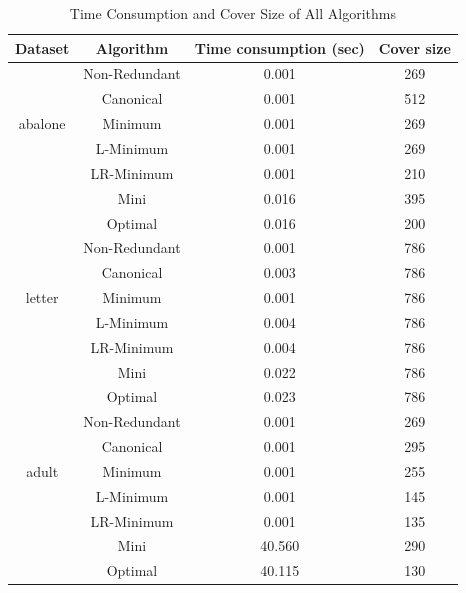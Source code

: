 \documentclass[11pt]{book}
\begin{document}
\begin{table}[H]

	\centering
	
\begin{tabular}{|c|c|c|c|}

    \hline
    Dataset & Algorithm & Time consumption (sec) & Cover size \\
    
    \hline
    \multirow{5}{*}{abalone}
    	& Non-Redundant & 0.001 & 269 \\
    	& Canonical     & 0.001 & 512 \\
    	& Minimum       & 0.001 & 269 \\
    	& L-Minimum     & 0.001 & 269 \\
    	& LR-Minimum    & 0.001 & 210 \\	
    	& Mini          & 0.016 & 395 \\	
    	& Optimal       & 0.016 & 200 \\

    \hline
    \multirow{5}{*}{letter}
    	& Non-Redundant & 0.001 & 786 \\
    	& Canonical     & 0.003 & 786 \\
    	& Minimum       & 0.001 & 786 \\
    	& L-Minimum     & 0.004 & 786 \\
    	& LR-Minimum    & 0.004 & 786 \\	
    	& Mini          & 0.022 & 786 \\	
    	& Optimal       & 0.023 & 786 \\

    \hline
    \multirow{5}{*}{adult}
    	& Non-Redundant & 0.001  & 269 \\
    	& Canonical     & 0.001  & 295 \\
    	& Minimum       & 0.001  & 255 \\
    	& L-Minimum     & 0.001  & 145 \\
    	& LR-Minimum    & 0.001  & 135 \\	
    	& Mini          & 40.560 & 290 \\	
    	& Optimal       & 40.115 & 130 \\
	
    \hline
    
\end{tabular}

	\caption{Time Consumption and Cover Size of All Algorithms}
	
\end{table}
\end{document}
